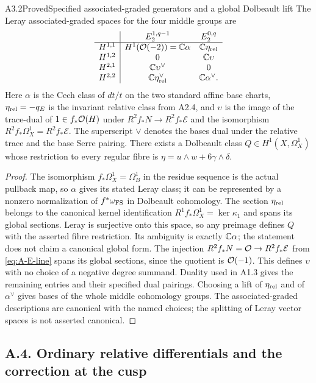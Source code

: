 \begin{claim}{A3.2}{Proved}{Specified associated-graded generators and a global Dolbeault lift}
The Leray associated-graded spaces for the four middle groups are
\[
\begin{array}{c|cc}
&E_2^{1,q-1}&E_2^{0,q}\\\hline
H^{1,1}&H^1(\mathcal O(-2))=\mathbb C\alpha&\mathbb C\eta_{\rm rel}\\
H^{1,2}&0&\mathbb C\upsilon\\
H^{2,1}&\mathbb C\upsilon^\vee&0\\
H^{2,2}&\mathbb C\eta_{\rm rel}^\vee&\mathbb C\alpha^\vee.
\end{array}
\]
Here $\alpha$ is the Cech class of $dt/t$ on the two standard affine
base charts, $\eta_{\rm rel}=-q_E$ is the invariant relative class
from A2.4, and $\upsilon$ is the image of the trace-dual of
$1\in f_*\mathcal O(H)$ under $R^2f_*N\to R^2f_*\mathcal E$ and the
isomorphism $R^2f_*\Omega_X^1=R^2f_*\mathcal E$.
The superscript $\vee$ denotes the bases dual under the relative
trace and the base Serre pairing.  There exists a Dolbeault class
$Q\in H^1(X,\Omega_X^1)$ whose restriction to every regular fibre
is $\eta=u\wedge w+6\gamma\wedge\delta$.
\end{claim}
\begin{proof}
The isomorphism $f_*\Omega_X^1=\Omega_B^1$ in the residue sequence
is the actual pullback map, so $\alpha$ gives its stated Leray
class; it can be represented by a nonzero normalization of
$f^*\omega_{\rm FS}$ in Dolbeault cohomology.  The section
$\eta_{\rm rel}$ belongs to the canonical kernel identification
$R^1f_*\Omega_X^1=\ker\kappa_1$ and spans its global sections.
Leray is surjective onto this space, so any preimage defines $Q$
with the asserted fibre restriction.  Its ambiguity is exactly
$\mathbb C\alpha$; the statement does not claim a canonical global form.
The injection $R^2f_*N=\mathcal O\to R^2f_*\mathcal E$ from
\eqref{eq:A-E-line} spans its global sections, since the quotient
is $\mathcal O(-1)$.  This defines $\upsilon$ with no choice of a negative
degree summand.  Duality used in A1.3 gives the remaining entries
and their specified dual pairings.  Choosing a lift of
$\eta_{\rm rel}$ and of $\alpha^\vee$ gives bases of the whole
middle cohomology groups.  The associated-graded descriptions are
canonical with the named choices; the splitting of Leray vector
spaces is not asserted canonical.
\end{proof}

\subsection{A.4. Ordinary relative differentials and the correction at the cusp}

